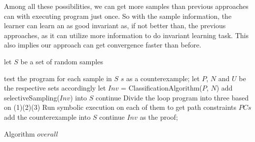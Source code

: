 








Among all these possibilities,
we can get more samples than previous approaches can with executing program just once.
So with the sample information, 
the learner can learn an as good invariant as, if not better than, the previous approaches, 
as it can utilize more information to do invariant learning task.
This also implies our approach can get convergence faster than before.









\begin{algorithm}[t]
\SetAlgoVlined
\Indm
{}
\Indp
let $S$ be a set of random samples\;
 {
    test the program for each sample in $S$\;
     {
        \Return $s$ as a counterexample;
    }
    let $P$, $N$ and $U$ be the respective sets accordingly\;
    let $Inv$ = ClassificationAlgorithm($P$, $N$)\;
     {
    	add selectiveSampling($Inv$) into $S$\;
    	continue\;
    }
    Divide the loop program into three based on (1)(2)(3)\;
    Run symbolic execution on each of them to get path constraints $PCs$\;
     {
    	 {
        	add the counterexample into $S$\;
        	continue\;
    	}
    }
    \Return $Inv$ as the proof;
    
}
\caption{Algorithm $overall$}
\label{alg:overall}
\end{algorithm}

